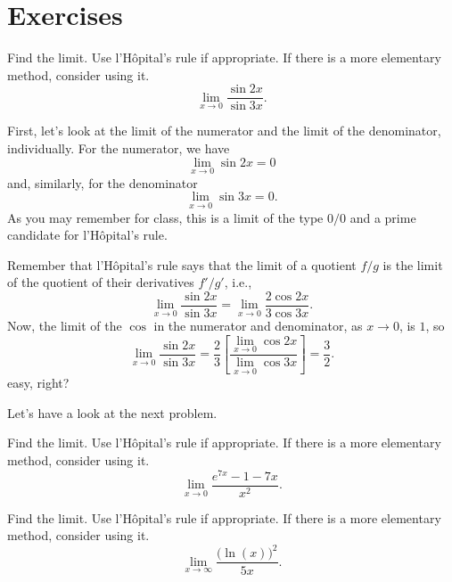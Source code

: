 \documentclass[article,oneside]{memoir}
\begin{document}
\section{Exercises}
\begin{problem*}
  Find the limit. Use l'Hôpital's rule if appropriate. If there is a more
  elementary method, consider using it.
  \[
    \lim_{x\to 0}\frac{\sin 2x}{\sin 3x}.
  \]
\end{problem*}
\begin{solution}
  First, let's look at the limit of the numerator and the limit of the
  denominator, individually. For the numerator, we have
  \[
    \lim_{x\to 0}\sin 2x=0
  \]
  and, similarly, for the denominator
  \[
    \lim_{x\to 0}\sin 3x=0.
  \]
  As you may remember for class, this is a limit of the type \(0/0\) and a
  prime candidate for l'Hôpital's rule.

  Remember that l'Hôpital's rule says that the limit of a quotient
  \(f/g\) is the limit of the quotient of their derivatives \(f'/g'\),
  i.e.,
  \[
    \lim_{x\to 0}\frac{\sin 2x}{\sin 3x}=
    \lim_{x\to 0}\frac{2\cos 2x }{3\cos 3x}.
  \]
  Now, the limit of the \(\cos\) in the numerator and denominator, as
  \(x\to 0\), is \(1\), so
  \[
    \lim_{x\to 0}\frac{\sin 2x}{\sin 3x}=%
    \frac{2}{3}
    \left[%
      \frac{\lim_{x\to 0}\cos 2x}{\lim_{x\to 0}\cos 3x}%
    \right]
    =\frac{3}{2}.
  \]
  easy, right?

  Let's have a look at the next problem.
\end{solution}

\begin{problem*}
  Find the limit. Use l'Hôpital's rule if appropriate. If there is a more
  elementary method, consider using it.
  \[
    \lim_{x\to 0}\frac{e^{7x}-1-7x}{x^2}.
  \]
\end{problem*}
\begin{solution}
\end{solution}

\begin{problem*}
  Find the limit. Use l'Hôpital's rule if appropriate. If there is a more
  elementary method, consider using it.
  \[
    \lim_{x\to\infty}\frac{\bigl( \ln(x) \bigr)^2}{5x}.
  \]
\end{problem*}
\begin{solution}
\end{solution}
\end{document}
